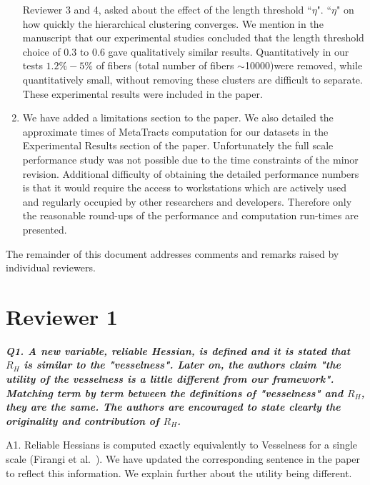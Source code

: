 \documentclass[]{article}
\begin{document}
\begin{enumerate}
{			Reviewer 3 and  4, asked  about the effect of the length threshold ``$\eta$".  ``$\eta$" on how quickly the hierarchical clustering converges. We mention in the manuscript that our experimental studies concluded that the length threshold choice of 0.3 to 0.6 gave qualitatively similar results. Quantitatively in our  tests $1.2\% - 5\%$ of fibers (total number of fibers $\sim$10000)were removed, while quantitatively small, without removing these clusters are difficult to separate. These experimental results were included in the paper.
			}
			\item{
				We have added a limitations section to the paper. We also detailed the approximate times of MetaTracts computation for our datasets in the Experimental Results section of the paper. Unfortunately the full scale performance study was not possible due to the time constraints of the minor revision. Additional difficulty of obtaining the detailed performance numbers is that it would require the access to workstations which are actively used and regularly occupied by other researchers and developers. Therefore only the reasonable round-ups of the performance and computation run-times are presented.
				}
\end{enumerate}
   
 The remainder of this document addresses comments and remarks raised by individual reviewers.

\section{Reviewer 1}

\textbf{\textit{
Q1. A new variable, reliable Hessian, is defined and it is stated that $R_{H}$ is similar to the "vesselness".  Later on, the authors claim "the utility of the vesselness is a little different from our framework". Matching term by term between the definitions of "vesselness" and $R_{H}$, they are the same. The authors are encouraged to state clearly the originality and contribution of $R_{H}$.
}}


A1. Reliable Hessians is computed exactly equivalently to Vesselness for a single scale (Firangi et al.~\cite{Frangi1998}). We have  updated the corresponding sentence in the paper to reflect this information. We explain further about the utility being different.
\end{document}
